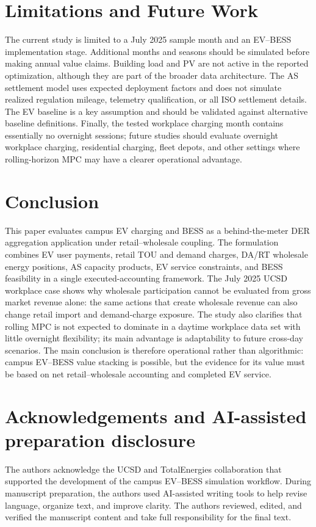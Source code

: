 \documentclass[final,5p,times]{elsarticle}
\begin{document}
\section{Limitations and Future Work}
\label{sec:limitations}

The current study is limited to a July 2025 sample month and an EV--BESS implementation stage. Additional months and seasons should be simulated before making annual value claims. Building load and PV are not active in the reported optimization, although they are part of the broader data architecture. The AS settlement model uses expected deployment factors and does not simulate realized regulation mileage, telemetry qualification, or all ISO settlement details. The EV baseline is a key assumption and should be validated against alternative baseline definitions. Finally, the tested workplace charging month contains essentially no overnight sessions; future studies should evaluate overnight workplace charging, residential charging, fleet depots, and other settings where rolling-horizon MPC may have a clearer operational advantage.

\section{Conclusion}
\label{sec:conclusion}

This paper evaluates campus EV charging and BESS as a behind-the-meter DER aggregation application under retail--wholesale coupling. The formulation combines EV user payments, retail TOU and demand charges, DA/RT wholesale energy positions, AS capacity products, EV service constraints, and BESS feasibility in a single executed-accounting framework. The July 2025 UCSD workplace case shows why wholesale participation cannot be evaluated from gross market revenue alone: the same actions that create wholesale revenue can also change retail import and demand-charge exposure. The study also clarifies that rolling MPC is not expected to dominate in a daytime workplace data set with little overnight flexibility; its main advantage is adaptability to future cross-day scenarios. The main conclusion is therefore operational rather than algorithmic: campus EV--BESS value stacking is possible, but the evidence for its value must be based on net retail--wholesale accounting and completed EV service.

\section*{Acknowledgements and AI-assisted preparation disclosure}
The authors acknowledge the UCSD and TotalEnergies collaboration that supported the development of the campus EV--BESS simulation workflow. During manuscript preparation, the authors used AI-assisted writing tools to help revise language, organize text, and improve clarity. The authors reviewed, edited, and verified the manuscript content and take full responsibility for the final text.
\end{document}
